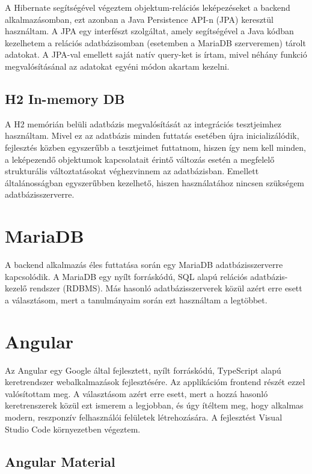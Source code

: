 \documentclass[a4paper,12pt]{report}
\theoremstyle{definition}
\theoremstyle{remark}
\begin{document}
A Hibernate\cite{Hibernatewebsite} segítségével végeztem objektum-relációs leképezéseket a backend alkalmazásomban, ezt azonban a Java Persistence API-n (JPA)\cite{JPAwebsite} keresztül használtam. A JPA egy interfészt szolgáltat, amely segítségével a Java kódban kezelhetem a relációs adatbázisomban (esetemben a MariaDB szerveremen) tárolt adatokat. A JPA-val emellett saját natív query-ket is írtam, mivel néhány funkció megvalósításánal az adatokat egyéni módon akartam kezelni.

	\subsection{H2 In-memory DB}

A H2\cite{H2website} memórián belüli adatbázis megvalósítását az integrációs tesztjeimhez használtam. Mivel ez az adatbázis minden futtatás esetében újra inicializálódik, fejlesztés közben egyszerűbb a tesztjeimet futtatnom, hiszen így nem kell minden, a leképezendő objektumok kapcsolatait érintő változás esetén a megfelelő strukturális változtatásokat véghezvinnem az adatbázisban. Emellett általánosságban egyszerűbben kezelhető, hiszen használatához nincsen szükségem adatbázisszerverre.

\section{MariaDB}

A backend alkalmazás éles futtatása során egy MariaDB\cite{Mariawebsite} adatbázisszerverre kapcsolódik. A MariaDB egy nyílt forráskódú, SQL alapú relációs adatbázis-kezelő rendszer (RDBMS). Más hasonló adatbázisszerverek közül azért erre esett a választásom, mert a tanulmányaim során ezt használtam a legtöbbet.

\section{Angular}

Az Angular\cite{Angularwebsite} egy Google által fejlesztett, nyílt forráskódú, TypeScript alapú keretrendszer webalkalmazások fejlesztésére. Az applikációm frontend részét ezzel valósítottam meg. A választásom azért erre esett, mert a hozzá hasonló keretrenszerek közül ezt ismerem a legjobban, és úgy ítéltem meg, hogy alkalmas modern, reszponzív felhasználói felületek létrehozására. A fejlesztést Visual Studio Code\cite{VSCwebsite} környezetben végeztem.

	\subsection{Angular Material}
\end{document}

